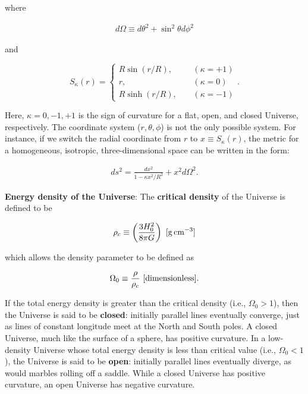 \documentclass[a4paper,11pt]{article}
\begin{document}
{\noindent}where

\begin{align*}
    d\Omega \equiv d\theta^2 + \sin^2\theta d\phi^2
\end{align*}

{\noindent}and

\begin{equation*}
    S_\kappa(r) =
    \left\{
    \begin{aligned}
    R\sin(r/R), ~~~~~& (\kappa = +1) \\
              r,~~~~~& (\kappa = 0) \\
    R\sinh(r/R),~~~~~& (\kappa = -1)
    \end{aligned}
    \right.
    .
\end{equation*}

{\noindent}Here, $\kappa=0,-1,+1$ is the sign of curvature for a flat, open, and closed Universe, respectively. The coordinate system ($r,\theta,\phi$) is not the only possible system. For instance, if we switch the radial coordinate from $r$ to $x \equiv S_\kappa(r)$, the metric for a homogeneous, isotropic, three-dimensional space can be written in the form:

\begin{align*}
    ds^2 = \frac{dx^2}{1-\kappa x^2/R^2} + x^2d\Omega^2.
\end{align*}

{\noindent}\textbf{Energy density of the Universe}: The \textbf{critical density} of the Universe is defined to be

\begin{align*}
    \rho_c \equiv \left( \frac{3H_0^2}{8\pi G} \right) ~ [{\rm g\,cm^{-3}}]
\end{align*}

{\noindent}which allows the density parameter to be defined as

\begin{align*}
    \Omega_0 \equiv \frac{\rho}{\rho_c} ~ [{\rm dimensionless}].
\end{align*}

{\noindent}If the total energy density is greater than the critical density (i.e., $\Omega_0>1$), then the Universe is said to be \textbf{closed}: initially parallel lines eventually converge, just as lines of constant longitude meet at the North and South poles. A closed Universe, much like the surface of a sphere, has positive curvature. In a low-density Universe whose total energy density is less than critical value (i.e., $\Omega_0<1$), the Universe is said to be \textbf{open}: initially parallel lines eventually diverge, as would marbles rolling off a saddle. While a closed Universe has positive curvature, an open Universe has negative curvature. 
\end{document}
